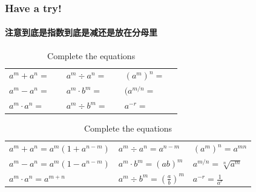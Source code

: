 \documentclass[
	11pt, %
]{beamer}
\begin{document}
	\begin{frame}
	\frametitle{Have a try!}
	\framesubtitle{注意到底是指数到底是减还是放在分母里}
	\begin{table}
		\begin{tabular}{l l l}
			\toprule
			$a^m + a^n= \quad $ & $a^m \div a^n = \quad$ & $(a^m)^n = \quad$ \\
      $a^m - a^n= \quad $ & $a^m \cdot b^m = \quad$ & $(a^{m/n} = \quad$ \\
      $a^m \cdot a^n= \quad $ & $a^m \div b^m = \quad$ & $ a^{-r} = \quad$ \\
			\bottomrule
		\end{tabular}
		\caption{Complete the equations}
	\end{table}

	\pause

		\begin{table}
		\begin{tabular}{l l l}
			\toprule
			$a^m + a^n=  a^m(1 + a^{n-m}) $ & $a^m \div a^n = a^{n-m}$ & $(a^m)^n = a^{mn}$ \\
      $a^m - a^n= a^m(1 - a^{n-m}) $ & $a^m \cdot b^m = (ab)^{m}$ & $a^{m/n} = \sqrt[n]{a^m}$ \\
      $a^m \cdot a^n=  a^{m + n}$ & $a^m \div b^m = (\frac{a}{b})^m$ & $ a^{-r} = \frac{1}{a^r}$ \\
			\bottomrule
		\end{tabular}
		\caption{Complete the equations}
	\end{table}

\end{frame}
\end{document}
